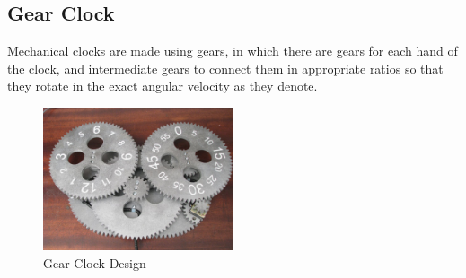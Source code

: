 \documentclass[10pt]{article} \usepackage[a4paper,left=0.8in,right=0.8in,top=0.4in,bottom=0.8in]{geometry} \usepackage{graphicx}
\begin{document}
\subsection{Gear Clock}
Mechanical clocks are made using gears, in which there are gears for each hand of the clock, and intermediate gears to connect them in appropriate ratios so that they rotate in the exact angular velocity as they denote.

\begin{figure}[ht!]
\centering
\includegraphics[width=0.5\textwidth]{images/gear_clock.jpg}
\caption{Gear Clock Design}
\end{figure}
\end{document}
